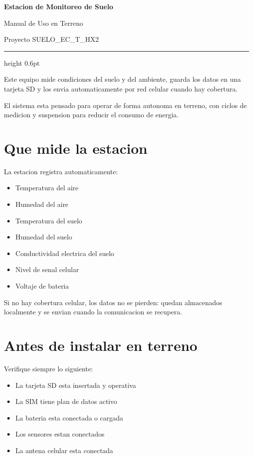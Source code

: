 \documentclass[11pt,a4paper]{article}
\newcommand{\manualrule}{\vspace{0.5em}\hrule height 0.6pt \color{rulecolor}\vspace{0.8em}}
\begin{document}
\begin{center}
  {\LARGE\bfseries Estacion de Monitoreo de Suelo\par}
  \vspace{0.4em}
  {\large Manual de Uso en Terreno\par}
  \vspace{0.6em}
  {\normalsize Proyecto SUELO\_EC\_T\_HX2\par}
\end{center}

\manualrule

Este equipo mide condiciones del suelo y del ambiente, guarda los datos en una tarjeta SD y los envia automaticamente por red celular cuando hay cobertura.

El sistema esta pensado para operar de forma autonoma en terreno, con ciclos de medicion y suspension para reducir el consumo de energia.

\section{Que mide la estacion}

La estacion registra automaticamente:

\begin{itemize}
  \item Temperatura del aire
  \item Humedad del aire
  \item Temperatura del suelo
  \item Humedad del suelo
  \item Conductividad electrica del suelo
  \item Nivel de senal celular
  \item Voltaje de bateria
\end{itemize}

Si no hay cobertura celular, los datos no se pierden: quedan almacenados localmente y se envian cuando la comunicacion se recupera.

\section{Antes de instalar en terreno}

Verifique siempre lo siguiente:

\begin{itemize}
  \item La tarjeta SD esta insertada y operativa
  \item La SIM tiene plan de datos activo
  \item La bateria esta conectada o cargada
  \item Los sensores estan conectados
  \item La antena celular esta conectada
\end{itemize}
\end{document}
